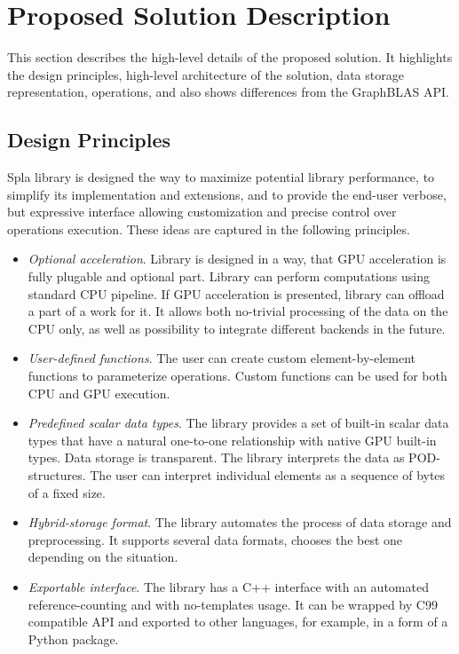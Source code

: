 \section{Proposed Solution Description}

This section describes the high-level details of the proposed solution. 
It highlights the design principles, high-level architecture of the solution, data storage representation, operations, and also shows differences from the GraphBLAS API.

\subsection{Design Principles}

Spla library is designed the way to maximize potential library performance, to simplify its implementation and extensions, and to provide the end-user verbose, but expressive interface allowing customization and precise control over operations execution. 
These ideas are captured in the following principles.

\begin{itemize}
    \item \textit{Optional acceleration}. Library is designed in a way, that GPU acceleration is fully plugable and optional part. Library can perform computations using standard CPU pipeline. If GPU acceleration is presented, library can offload a part of a work for it. It allows both no-trivial processing of the data on the CPU only, as well as possibility to integrate different backends in the future.  
    \item \textit{User-defined functions}. The user can create custom element-by-element functions to parameterize operations. Custom functions can be used for both CPU and GPU execution.
    \item \textit{Predefined scalar data types}. The library provides a set of built-in scalar data types that have a natural one-to-one relationship with native GPU built-in types. Data storage is transparent. The library interprets the data as POD-structures. The user can interpret individual elements as a sequence of bytes of a fixed size.
    \item \textit{Hybrid-storage format}. The library automates the process of data storage and preprocessing. It supports several data formats, chooses the best one depending on the situation.
    \item \textit{Exportable interface}. The library has a C++ interface with an automated reference-counting and with no-templates usage. It can be wrapped by C99 compatible API and exported to other languages, for example, in a form of a Python package.
\end{itemize}

